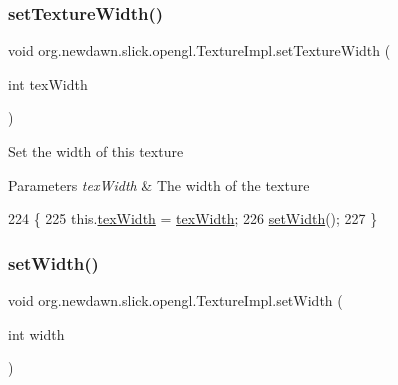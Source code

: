 \subsubsection{\texorpdfstring{set\+Texture\+Width()}{setTextureWidth()}}
{\footnotesize\ttfamily void org.\+newdawn.\+slick.\+opengl.\+Texture\+Impl.\+set\+Texture\+Width (\begin{DoxyParamCaption}\item[{int}]{tex\+Width }\end{DoxyParamCaption})\hspace{0.3cm}{\ttfamily [inline]}}

Set the width of this texture


\begin{DoxyParams}{Parameters}
{\em tex\+Width} & The width of the texture \\
\hline
\end{DoxyParams}

\begin{DoxyCode}
224                                               \{
225         this.\mbox{\hyperlink{classorg_1_1newdawn_1_1slick_1_1opengl_1_1_texture_impl_acb22083c60049df21f8e484413d73212}{texWidth}} = \mbox{\hyperlink{classorg_1_1newdawn_1_1slick_1_1opengl_1_1_texture_impl_acb22083c60049df21f8e484413d73212}{texWidth}};
226         \mbox{\hyperlink{classorg_1_1newdawn_1_1slick_1_1opengl_1_1_texture_impl_acac95e7726dd15b2fed3e6370f69f11e}{setWidth}}();
227     \}
\end{DoxyCode}
\mbox{\label{classorg_1_1newdawn_1_1slick_1_1opengl_1_1_texture_impl_a42c503751c7342ebfca3a8c5ab7b8c18}} 
\subsubsection{\texorpdfstring{set\+Width()}{setWidth()}\hspace{0.1cm}{\footnotesize\ttfamily [1/2]}}
{\footnotesize\ttfamily void org.\+newdawn.\+slick.\+opengl.\+Texture\+Impl.\+set\+Width (\begin{DoxyParamCaption}\item[{int}]{width }\end{DoxyParamCaption})\hspace{0.3cm}{\ttfamily [inline]}}

